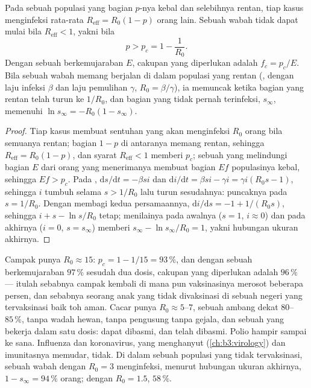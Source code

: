 \begin{theorem}\label{thm:b3:adaptive-immunity:herd}
Pada sebuah populasi yang bagian $p$-nya kebal dan selebihnya
rentan, tiap kasus menginfeksi rata-rata $R_{\text{eff}} = R_{0}(1 -
p)$ orang lain. Sebuah wabah tidak dapat mulai bila $R_{\text{eff}} < 1$, yakni
bila
\[
p > p_{c} = 1 - \frac{1}{R_{0}} .
\]
Dengan sebuah  berkemujaraban $E$, cakupan yang diperlukan adalah $f_{c} = p_{c}/E$.
Bila sebuah wabah memang berjalan di dalam populasi yang rentan (,
dengan laju infeksi $\beta$ dan laju pemulihan $\gamma$, $R_{0} =
\beta/\gamma$), ia memuncak ketika bagian yang rentan telah turun ke
$1/R_{0}$, dan bagian yang tidak pernah terinfeksi, $s_{\infty}$, memenuhi
$\ln s_{\infty} = -R_{0}(1 - s_{\infty})$.
\end{theorem}
\begin{proof}
Tiap kasus membuat sentuhan yang akan menginfeksi $R_{0}$ orang bila semuanya
rentan; bagian $1 - p$ di antaranya memang rentan, sehingga $R_{\text{eff}} =
R_{0}(1-p)$, dan syarat $R_{\text{eff}} < 1$ memberi $p_{c}$; sebuah
 yang melindungi bagian $E$ dari orang yang menerimanya membuat
bagian $Ef$ populasinya kebal, sehingga $Ef > p_{c}$. Pada , $\mathrm{d}s/\mathrm{d}t = -\beta si$ dan $\mathrm{d}i/\mathrm{d}t =
\beta si - \gamma i = \gamma i(R_{0}s - 1)$, sehingga $i$ tumbuh selama $s >
1/R_{0}$ lalu turun sesudahnya: puncaknya pada $s = 1/R_{0}$. Dengan membagi
kedua persamaannya, $\mathrm{d}i/\mathrm{d}s = -1 + 1/(R_{0}s)$, sehingga $i + s -
\ln s/R_{0}$ tetap; menilainya pada awalnya ($s = 1$, $i
\approx 0$) dan pada akhirnya ($i = 0$, $s = s_{\infty}$) memberi
$s_{\infty} - \ln s_{\infty}/R_{0} = 1$, yakni hubungan ukuran akhirnya.
\end{proof}

\begin{example}\label{ex:b3:adaptive-immunity:measles}
Campak punya $R_{0} \approx 15$: $p_{c} = 1 - 1/15 = 93\,\%$, dan dengan
sebuah  berkemujaraban $97\,\%$ sesudah dua dosis, cakupan yang diperlukan
adalah $96\,\%$ --- itulah sebabnya campak kembali di mana pun vaksinasinya
merosot beberapa persen, dan sebabnya seorang anak yang tidak divaksinasi di
sebuah negeri yang tervaksinasi baik toh aman. Cacar punya $R_{0} \approx 5$--$7$,
sebuah ambang dekat $80$--$85\,\%$, tanpa wadah hewan, tanpa pengusung
tanpa gejala, dan sebuah  yang bekerja dalam satu dosis: dapat dibasmi, dan
telah dibasmi. Polio hampir sampai ke sana. Influenza dan koronavirus,
yang  menghanyut (\cref{ch:b3:virology}) dan imunitasnya memudar,
tidak. Di dalam sebuah populasi yang tidak tervaksinasi, sebuah wabah dengan
$R_{0} = 3$ menginfeksi, menurut hubungan ukuran akhirnya,
$1 - s_{\infty} = 94\,\%$ orang; dengan $R_{0} = 1.5$, $58\,\%$.
\end{example}

